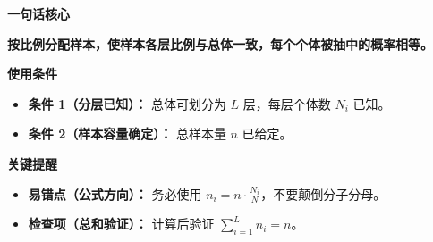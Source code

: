 \begin{summarybox}
	\textbf{\textcolor{CSummary}{一句话核心}}

	\textbf{按比例分配样本，使样本各层比例与总体一致，每个个体被抽中的概率相等。}

	\medskip
	\textbf{\textcolor{CSummary}{使用条件}}
	\begin{itemize}[leftmargin=*, itemsep=0.5em, topsep=0.4em]
		\item \textbf{条件 1（分层已知）：} 总体可划分为 $L$ 层，每层个体数 $N_i$ 已知。
		\item \textbf{条件 2（样本容量确定）：} 总样本量 $n$ 已给定。
	\end{itemize}

	\medskip
	\textbf{\textcolor{CSummary}{关键提醒}}
	\begin{itemize}[leftmargin=*, itemsep=0.5em, topsep=0.4em]
		\item \textbf{易错点（公式方向）：} 务必使用 $n_i = n \cdot \frac{N_i}{N}$，不要颠倒分子分母。
		\item \textbf{检查项（总和验证）：} 计算后验证 $\sum_{i=1}^L n_i = n$。
	\end{itemize}
\end{summarybox}
